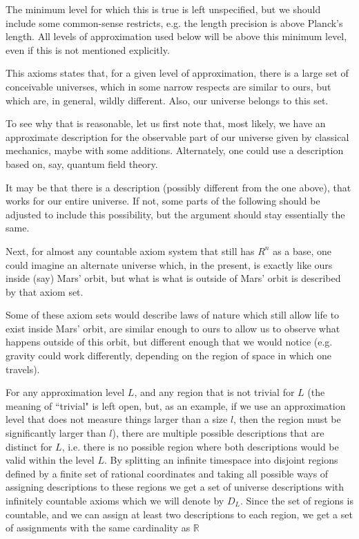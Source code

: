 \documentclass[a4paper
,draft
]{article}
\def\reale{\mathbb{R}}
\def\descriptions{D_L}
\newcommand{\ghilimele}[1]{``#1"}
\begin{document}
The minimum level for which this is true is left unspecified, but we should
include some common-sense restricts, e.g. the length precision is above
Planck's length. All levels of approximation used below will be above this
minimum level, even if this is not mentioned explicitly.

This axioms states that, for a given level of approximation,
there is a large set of conceivable universes, which in some narrow respects
are similar to ours, but which are, in general, wildly different.
Also, our universe belongs to this set.

To see why that is reasonable, let us first note that,
most likely, we have an approximate description for the observable part
of our universe
given by classical mechanics, maybe with some additions.
Alternately, one could use a description based on, say, quantum field theory.

It may be that there is a description (possibly different from the one above),
that works for our entire universe.
If not, some parts of the following should
be adjusted to include this possibility, but the argument should stay
essentially the same.

Next, for almost any countable axiom system that still
has $R^n$ as a base, one could imagine an alternate universe
which, in the present, is exactly like ours inside (say) Mars' orbit,
but what is what is outside of Mars' orbit is described by that axiom set.

Some of these axiom sets would describe laws of nature which still allow life
to exist inside Mars' orbit, are similar enough
to ours to allow us to observe what happens outside of this orbit,
but different enough that
we would notice (e.g. gravity could work differently, depending on the region
of space in which one travels).

For any approximation level $L$, and any region that is not trivial
for $L$
(the meaning of \ghilimele{trivial} is left open, but, as an example,
if we use an approximation level that does not measure things larger
than a size $l$, then the region must be significantly larger than $l$),
there are multiple possible descriptions that
are distinct for $L$, i.e. there is no possible region where both descriptions
would be valid within the level $L$.
By splitting an infinite timespace
into disjoint regions defined by a finite set of rational coordinates
and taking all possible ways of assigning descriptions to these regions
we get a set of universe descriptions with infinitely countable axioms
which we will denote by $\descriptions$.
Since the set of regions is countable, and we can assign at least two
descriptions to each region, we get a set of assignments with the same
cardinality as $\reale$
\end{document}
